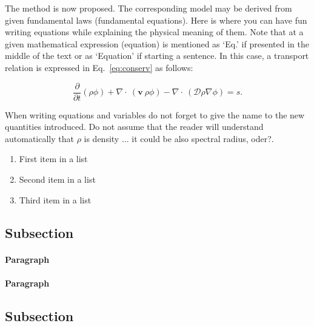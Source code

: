 \documentclass[fleqn,12pt]{NTFD} %
\begin{document}
The method is now proposed. The corresponding model may be derived from given fundamental laws (fundamental equations). Here is where you can have fun writing equations while explaining the physical meaning of them. Note that at a given mathematical expression (equation) is mentioned as `Eq.' if  presented in the middle of the text or as `Equation' if starting a sentence. In this case, a transport relation is expressed in Eq.~\eqref{eq:conserv} as follows: 

\begin{equation}
\frac{\partial}{\partial t} \left( \rho \phi\right) + \nabla \cdot\ \left( \boldsymbol{v}  \ \rho\phi \right) -  \nabla \cdot\ \left( \mathcal{D}\rho  \nabla \phi \right)  =  s .
\label{eq:conserv}
\end{equation}

When writing equations and variables do not forget to give the name to the new quantities introduced. Do not assume that the reader will understand automatically that $\rho$ is density ... it could be also spectral radius, oder?. 


\lipsum[4] %



\lipsum[5] %

\begin{enumerate}[noitemsep] %
\item First item in a list
\item Second item in a list
\item Third item in a list
\end{enumerate}

\subsection{Subsection}

\lipsum[6] %

\paragraph{Paragraph} \lipsum[7] %
\paragraph{Paragraph} \lipsum[8] %

\subsection{Subsection}
\end{document}
